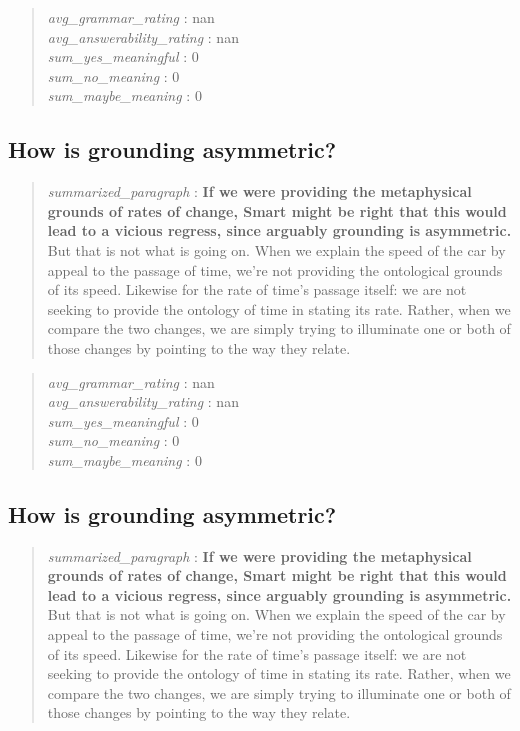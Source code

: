 \begin{quote}
\emph{avg\_grammar\_rating} : nan\\
\emph{avg\_answerability\_rating} : nan\\
\emph{sum\_yes\_meaningful} : 0\\
\emph{sum\_no\_meaning} : 0\\
\emph{sum\_maybe\_meaning} : 0
\end{quote}

\hypertarget{how-is-grounding-asymmetric}{%
\subsection{How is grounding
asymmetric?}\label{how-is-grounding-asymmetric}}

\begin{quote}
\emph{summarized\_paragraph} : \textbf{If we were providing the
metaphysical grounds of rates of change, Smart might be right that this
would lead to a vicious regress, since arguably grounding is
asymmetric.} But that is not what is going on. When we explain the speed
of the car by appeal to the passage of time, we're not providing the
ontological grounds of its speed. Likewise for the rate of time's
passage itself: we are not seeking to provide the ontology of time in
stating its rate. Rather, when we compare the two changes, we are simply
trying to illuminate one or both of those changes by pointing to the way
they relate.
\end{quote}

\begin{quote}
\emph{avg\_grammar\_rating} : nan\\
\emph{avg\_answerability\_rating} : nan\\
\emph{sum\_yes\_meaningful} : 0\\
\emph{sum\_no\_meaning} : 0\\
\emph{sum\_maybe\_meaning} : 0
\end{quote}

\hypertarget{how-is-grounding-asymmetric-1}{%
\subsection{How is grounding
asymmetric?}\label{how-is-grounding-asymmetric-1}}

\begin{quote}
\emph{summarized\_paragraph} : \textbf{If we were providing the
metaphysical grounds of rates of change, Smart might be right that this
would lead to a vicious regress, since arguably grounding is
asymmetric.} But that is not what is going on. When we explain the speed
of the car by appeal to the passage of time, we're not providing the
ontological grounds of its speed. Likewise for the rate of time's
passage itself: we are not seeking to provide the ontology of time in
stating its rate. Rather, when we compare the two changes, we are simply
trying to illuminate one or both of those changes by pointing to the way
they relate.
\end{quote}

